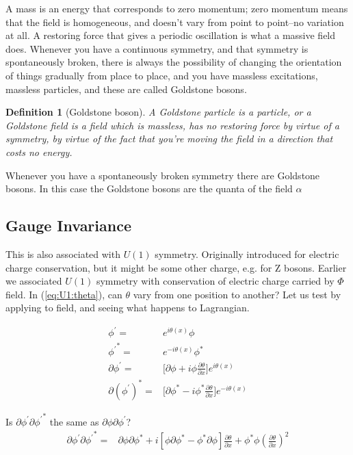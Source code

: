 \documentclass[]{article}
\newtheorem{defn}[thm]{Definition}
\begin{document}
A mass is an energy that corresponds to zero momentum; zero momentum means that the field is homogeneous, and doesn't vary from point to point--no variation at all. A restoring force that gives a periodic oscillation is what a massive field does. Whenever you have a continuous symmetry, and that symmetry is spontaneously broken, there is always the possibility of changing the orientation of things gradually from place to place, and you have massless excitations, massless particles, and these are called Goldstone bosons.
\begin{defn}[Goldstone boson]
	 A Goldstone particle is a particle, or a Goldstone field is a field which is massless, has no restoring force by virtue of a symmetry, by virtue of the fact that you're moving the field in a direction that costs no energy.
\end{defn}
 Whenever you have a spontaneously broken symmetry there are Goldstone bosons. In this case the Goldstone bosons are the quanta of the field $\alpha$

\subsection{Gauge Invariance}\label{section:gauge:invariance}

This is also associated with $U(1)$ symmetry. Originally introduced for electric charge conservation, but it might be some other charge, e.g. for Z bosons. Earlier we associated $U(1)$ symmetry with conservation of electric charge carried by $\Phi$ field. In (\ref{eq:U1:theta}), can $\theta$ vary from one position to another? Let us test by applying to field, and seeing what happens to Lagrangian.

\begin{align*}
	\phi^\prime =& e^{i \theta(x)} \phi \\
	{\phi^\prime}^* =& e^{-i \theta(x)} \phi^*\\
	\partial \phi^\prime =& \big[\partial \phi + i \phi \frac{\partial \theta}{\partial x}\big] e^{i \theta(x)}\\
	\partial (\phi^\prime)^* =& \big[\partial \phi^* - i \phi^* \frac{\partial \theta}{\partial x}\big] e^{-i \theta(x)}
\end{align*}

Is $\partial \phi^\prime \partial {\phi^\prime}^*$ the same as $\partial \phi \partial {\phi^\prime}$?
\begin{align*}
\partial \phi^\prime \partial {\phi^\prime}^* =&\partial \phi \partial \phi^* + i[\phi \partial \phi^* -\phi^* \partial \phi]\frac{\partial \theta}{\partial x} + \phi^* \phi (\frac{\partial \theta}{\partial x})^2
\end{align*}
\end{document}
